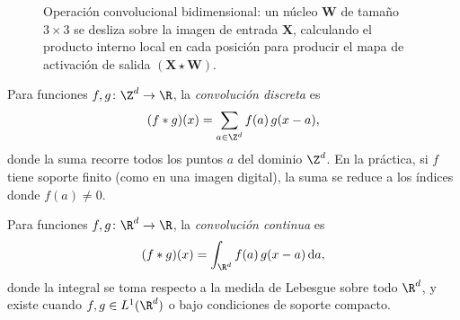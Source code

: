 \begin{figure}[t]
\caption[Operaci\'on convolucional 2D]{Operaci\'on convolucional bidimensional:
un n\'ucleo $\mathbf{W}$ de tama\~no $3 \times 3$ se desliza sobre la imagen de
entrada $\mathbf{X}$, calculando el producto interno local en cada posici\'on
para producir el mapa de activaci\'on de salida $(\mathbf{X} \star \mathbf{W})$.}
\label{fig:grids:conv}
\end{figure}

\begin{definition}
\label{def:grids:discrete-conv}
Para funciones $f, g \colon \Z^d \to \R$, la \emph{convoluci\'on discreta} es
\[
  (f \conv g)(x) = \sum_{a \in \Z^d} f(a)\, g(x - a),
\]
donde la suma recorre todos los puntos $a$ del dominio $\Z^d$. En la pr\'actica,
si $f$ tiene soporte finito (como en una imagen digital), la suma se reduce a
los \'indices donde $f(a) \neq 0$.
\end{definition}

\begin{definition}
\label{def:grids:continuous-conv}
Para funciones $f, g \colon \R^d \to \R$, la \emph{convoluci\'on continua} es
\[
  (f \conv g)(x) = \int_{\R^d} f(a)\, g(x - a)\, \mathrm{d}a,
\]
donde la integral se toma respecto a la medida de Lebesgue sobre todo $\R^d$, y
existe cuando $f, g \in L^1(\R^d)$ o bajo condiciones de soporte compacto.
\end{definition}

